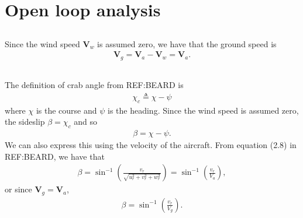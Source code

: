 \section{Open loop analysis}

\subsection{}
Since the wind speed $\mathbf{V}_w$ is assumed zero, we have that the ground speed is
\begin{equation}\begin{aligned}
\label{eq:ground_air}
\mathbf{V}_g = \mathbf{V}_a - \mathbf{V}_w = \mathbf{V}_a.
\end{aligned}\end{equation}

\subsection{}
The definition of crab angle from REF:BEARD is
\begin{equation}\begin{aligned}
\chi_c \triangleq \chi - \psi
\end{aligned}\end{equation}
where $\chi$ is the course and $\psi$ is the heading. Since the wind speed is assumed zero, the sideslip $\beta = \chi_c$ and so
\begin{equation}\begin{aligned}
\beta = \chi - \psi.
\end{aligned}\end{equation}
We can also express this using the velocity of the aircraft. From equation (2.8) in REF:BEARD, we have that
\begin{equation}\begin{aligned}
\beta = \sin^{-1}\left(\frac{v_r}{\sqrt{u^2_r + v^2_r + w^2_r}}\right) = \sin^{-1}\left(\frac{v_r}{V_a}\right),
\end{aligned}\end{equation}
or since $\mathbf{V}_g = \mathbf{V}_a$,
\begin{equation}\begin{aligned}
\beta = \sin^{-1}\left(\frac{v_r}{V_g}\right).
\end{aligned}\end{equation}

